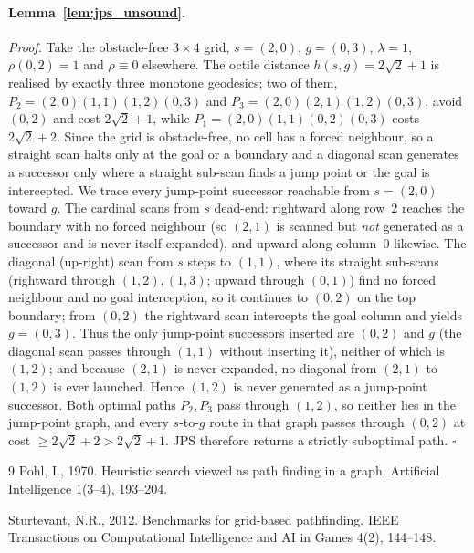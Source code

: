 \documentclass[11pt]{article}
\begin{document}
\paragraph{Lemma~\ref{lem:jps_unsound}.}
\noindent\textit{Proof.}
Take the obstacle-free $3\times4$ grid, $s = (2,0)$, $g = (0,3)$, $\lambda = 1$, $\rho(0,2) = 1$ and $\rho \equiv 0$ elsewhere. The octile distance $h(s,g) = 2\sqrt2 + 1$ is realised by exactly three monotone geodesics; two of them, $P_2 = (2,0)(1,1)(1,2)(0,3)$ and $P_3 = (2,0)(2,1)(1,2)(0,3)$, avoid $(0,2)$ and cost $2\sqrt2+1$, while $P_1 = (2,0)(1,1)(0,2)(0,3)$ costs $2\sqrt2 + 2$. Since the grid is obstacle-free, no cell has a forced neighbour, so a straight scan halts only at the goal or a boundary and a diagonal scan generates a successor only where a straight sub-scan finds a jump point or the goal is intercepted. We trace every jump-point successor reachable from $s=(2,0)$ toward $g$. The cardinal scans from $s$ dead-end: rightward along row~$2$ reaches the boundary with no forced neighbour (so $(2,1)$ is scanned but \emph{not} generated as a successor and is never itself expanded), and upward along column~$0$ likewise. The diagonal (up-right) scan from $s$ steps to $(1,1)$, where its straight sub-scans (rightward through $(1,2),(1,3)$; upward through $(0,1)$) find no forced neighbour and no goal interception, so it continues to $(0,2)$ on the top boundary; from $(0,2)$ the rightward scan intercepts the goal column and yields $g=(0,3)$. Thus the only jump-point successors inserted are $(0,2)$ and $g$ (the diagonal scan passes through $(1,1)$ without inserting it), neither of which is $(1,2)$; and because $(2,1)$ is never expanded, no diagonal from $(2,1)$ to $(1,2)$ is ever launched. Hence $(1,2)$ is never generated as a jump-point successor. Both optimal paths $P_2,P_3$ pass through $(1,2)$, so neither lies in the jump-point graph, and every $s$-to-$g$ route in that graph passes through $(0,2)$ at cost $\geq 2\sqrt2 + 2 > 2\sqrt2 + 1$. JPS therefore returns a strictly suboptimal path. $\square$

\begin{thebibliography}{9}
Pohl, I., 1970.
Heuristic search viewed as path finding in a graph.
Artificial Intelligence 1(3--4), 193--204.

Sturtevant, N.R., 2012.
Benchmarks for grid-based pathfinding.
IEEE Transactions on Computational Intelligence and AI in Games 4(2), 144--148.
\end{thebibliography}
\end{document}
